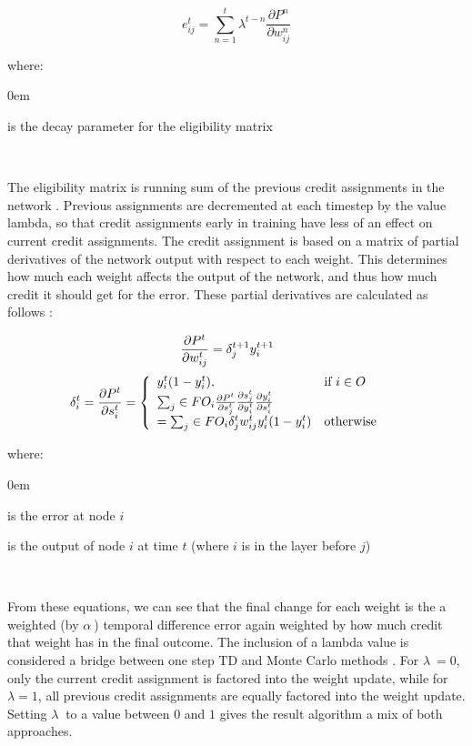 \documentclass{sig-alternate-05-2015}
\begin{document}
\begin{equation}
e_{ij}^t = \sum_{n=1}^{t} \lambda^{t-n} \frac{\partial P^n}{\partial w_{ij}^n}
\end{equation}

where:
\begin{description}
\itemsep0em 
\item [\lambda] is the decay parameter for the eligibility matrix
\end{description} 
\

The eligibility matrix is running sum of the previous credit assignments in the network \cite{sutton1998reinforcement}. Previous assignments are decremented at each timestep by the value lambda, so that credit assignments early in training have less of an effect on current credit assignments. The credit assignment is based on a matrix of partial derivatives of the network output with respect to each weight. This determines how much each weight affects the output of the network, and thus how much credit it should get for the error. These partial derivatives are calculated as follows \cite{sutton1989implementation}:

\begin{equation}
\hspace*{-.5cm}\frac{\partial P^t}{\partial w_{ij}^t} = \delta_{j}^{t+1} y_i^{t+1}
\end{equation}
\begin{equation}
\hspace*{-.5cm}\delta_{i}^{t}= \frac{\partial P^t}{\partial s_{i}^t} =
\left\{
	\begin{array}{lll}
		y_{i}^{t} (1 - y_{i}^{t}), & \mbox{if } i \in  O \\
		\sum_{j} \in FO_i \frac{\partial P^t}{\partial s_{j}^t} \frac{\partial s_j^t}{\partial y_{i}^t} \frac{\partial y_i^t}{\partial s_{i}^t}\\ =  
		\sum_{j} \in FO_i \delta_{j}^{t} w_{ij}^{t} y_i^t (1 - y_i^t) & \mbox{otherwise}
	\end{array}
\right.
\end{equation}

where:
\begin{description}
\itemsep0em 
\item [\delta_{i}^t] is the error at node $i$
\item[y_i^t] is the output of node $i$  at time $t$ (where $i$ is in the layer before $j$)
\end{description} 
\


From these equations, we can see that the final change for each weight is the a weighted (by $\alpha\ $) temporal difference error again weighted by how much credit that weight has in the final outcome. The inclusion of a lambda value is considered a bridge between one step TD and Monte Carlo methods \cite{sutton1998reinforcement}. For $\lambda\ = 0$, only the current credit assignment is factored into the weight update, while for $\lambda=1$, all previous credit assignments are equally factored into the weight update. Setting $\lambda\ $ to a value between $0$ and $1$ gives the result algorithm a mix of both approaches.
\end{document}
